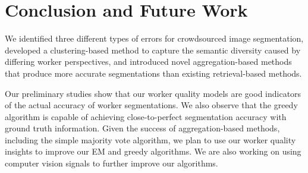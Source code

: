\vspace{-15pt}
\section{Conclusion and Future Work}
We identified three different types of errors for crowdsourced image segmentation, developed a clustering-based method to capture the semantic diversity caused by differing worker perspectives, and introduced novel aggregation-based methods that produce more accurate segmentations than existing retrieval-based methods.
\par Our preliminary studies show that our worker quality models are good indicators of the actual accuracy of worker segmentations. We also observe that the greedy algorithm is capable of achieving close-to-perfect segmentation accuracy with ground truth information. Given the success of aggregation-based methods, including the simple majority vote algorithm, we plan to use our worker quality insights to improve our EM and greedy algorithms. 
We are also working on using computer vision signals to further improve our algorithms.
